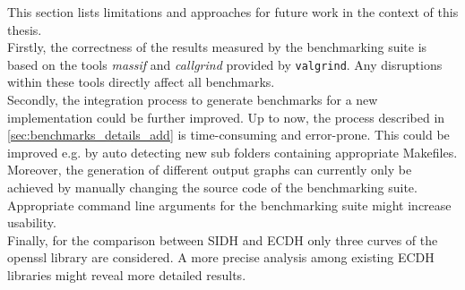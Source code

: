 This section lists limitations and approaches for future work in the context of this thesis.
\\
Firstly, the correctness of the results measured by the benchmarking suite is based on the tools \textit{massif} and \textit{callgrind} provided by \texttt{valgrind}. Any disruptions within these tools directly affect all benchmarks.
\\
Secondly, the integration process to generate benchmarks for a new implementation could be further improved. Up to now, the process described in \ref{sec:benchmarks_details_add} is time-consuming and error-prone. This could be improved e.g. by auto detecting new sub folders containing appropriate Makefiles. Moreover, the generation of different output graphs can currently only be achieved by manually changing the source code of the benchmarking suite. Appropriate command line arguments for the benchmarking suite might increase usability.
\\
Finally, for the comparison between \gls{SIDH} and \gls{ECDH} only three curves of the  \gls{openssl} library are considered. A more precise analysis among existing \gls{ECDH} libraries might reveal more detailed results.
